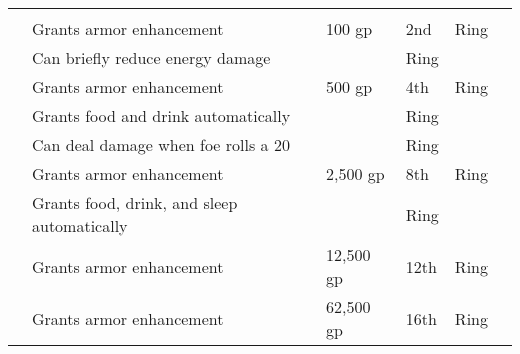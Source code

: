 \begin{longtabuwrapper}
\begin{longtabu}{l X l l l l}
                \midrule
                 &  &  &  &  &  \\
                  & Grants  armor enhancement & 100 gp & 2nd & Ring &  \\
                 & Can briefly reduce energy damage &  & Ring &  \\
                  & Grants  armor enhancement & 500 gp & 4th & Ring &  \\
                 & Grants food and drink automatically &  & Ring &  \\
                 & Can deal damage when foe rolls a 20 &  & Ring &  \\
                  & Grants  armor enhancement & 2,500 gp & 8th & Ring &  \\
                 & Grants food, drink, and sleep automatically &  & Ring &  \\
                  & Grants  armor enhancement & 12,500 gp & 12th & Ring &  \\
                  & Grants  armor enhancement & 62,500 gp & 16th & Ring &  \\


\end{longtabu}
\end{longtabuwrapper}
